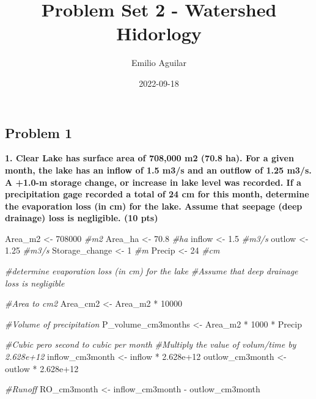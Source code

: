 \documentclass[
]{article}
\title{Problem Set 2 - Watershed Hidorlogy}
\author{Emilio Aguilar}
\date{2022-09-18}
\newenvironment{Shaded}{\begin{snugshade}}{\end{snugshade}}
\newcommand{\CommentTok}[1]{\textcolor[rgb]{0.56,0.35,0.01}{\textit{#1}}}
\newcommand{\DecValTok}[1]{\textcolor[rgb]{0.00,0.00,0.81}{#1}}
\newcommand{\FloatTok}[1]{\textcolor[rgb]{0.00,0.00,0.81}{#1}}
\newcommand{\NormalTok}[1]{#1}
\newcommand{\OtherTok}[1]{\textcolor[rgb]{0.56,0.35,0.01}{#1}}
\newcommand{\SpecialCharTok}[1]{\textcolor[rgb]{0.00,0.00,0.00}{#1}}
\begin{document}
\maketitle

\hypertarget{problem-1}{%
\subsection{Problem 1}\label{problem-1}}

\textbf{1. Clear Lake has surface area of 708,000 m2 (70.8 ha). For a
given month, the lake has an inflow of 1.5 m3/s and an outflow of 1.25
m3/s. A +1.0-m storage change, or increase in lake level was recorded.
If a precipitation gage recorded a total of 24 cm for this month,
determine the evaporation loss (in cm) for the lake. Assume that seepage
(deep drainage) loss is negligible. (10 pts)}

\begin{Shaded}
\begin{Highlighting}[]
\NormalTok{Area\_m2 }\OtherTok{\textless{}{-}} \DecValTok{708000} \CommentTok{\#m2}
\NormalTok{Area\_ha }\OtherTok{\textless{}{-}} \FloatTok{70.8} \CommentTok{\#ha}
\NormalTok{inflow }\OtherTok{\textless{}{-}} \FloatTok{1.5} \CommentTok{\#m3/s}
\NormalTok{outlow }\OtherTok{\textless{}{-}} \FloatTok{1.25} \CommentTok{\#m3/s}
\NormalTok{Storage\_change }\OtherTok{\textless{}{-}} \DecValTok{1} \CommentTok{\#m}
\NormalTok{Precip }\OtherTok{\textless{}{-}} \DecValTok{24} \CommentTok{\#cm}

\CommentTok{\#determine evaporation loss (in cm) for the lake}
\CommentTok{\#Assume that deep drainage loss is negligible }

\CommentTok{\#Area to cm2}
\NormalTok{Area\_cm2 }\OtherTok{\textless{}{-}}\NormalTok{ Area\_m2 }\SpecialCharTok{*} \DecValTok{10000}

\CommentTok{\#Volume of precipitation}
\NormalTok{P\_volume\_cm3months }\OtherTok{\textless{}{-}}\NormalTok{ Area\_m2 }\SpecialCharTok{*} \DecValTok{1000} \SpecialCharTok{*}\NormalTok{ Precip}

\CommentTok{\#Cubic pero second to cubic per month}
\CommentTok{\#Multiply the value of volum/time by 2.628e+12}
\NormalTok{inflow\_cm3month }\OtherTok{\textless{}{-}}\NormalTok{ inflow }\SpecialCharTok{*} \FloatTok{2.628e+12}
\NormalTok{outlow\_cm3month }\OtherTok{\textless{}{-}}\NormalTok{ outlow }\SpecialCharTok{*} \FloatTok{2.628e+12}


\CommentTok{\#Runoff}
\NormalTok{RO\_cm3month }\OtherTok{\textless{}{-}}\NormalTok{ inflow\_cm3month }\SpecialCharTok{{-}}\NormalTok{ outlow\_cm3month}
\end{Highlighting}
\end{Shaded}
\end{document}
